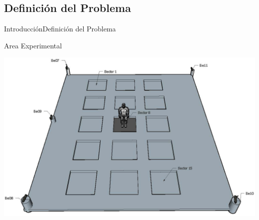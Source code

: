 \documentclass[10pt]{beamer}
\begin{document}
\subsection{Definición del Problema}
\begin{frame}{Introducción}{Definición del Problema}
\begin{block}{Area Experimental}
\begin{center}
\includegraphics[scale=0.6]{AAUgraphics/sensors}
\end{center}
\end{block}
\end{frame}
\end{document}
